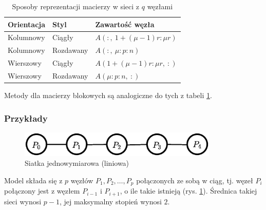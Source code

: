 \begin{table}[H]
\centering
\caption{Sposoby reprezentacji macierzy w sieci z \(q\) węzłami}
\begin{tabular}{ l | l | l }\label{tab:network_datatype}
  Orientacja & Styl & Zawartość węzła \\
  \hline
  Kolumnowy & Ciągły & \(A(\colon,\: 1+(\mu-1)r\colon \mu r)\) \\
  Kolumnowy & Rozdawany & \(A(\colon,\: \mu\colon p\colon n)\) \\
  Wierszowy & Ciągły & \(A(1+(\mu -1) r\colon\mu r,\: \colon)\) \\
  Wierszowy & Rozdawany & \(A(\mu \colon p\colon n,\: \colon)\) \\
 \end{tabular} 
 \end{table}

Metody dla macierzy blokowych są analogiczne do tych z tabeli \ref{tab:network_datatype}.





\subsubsection{Przykłady}
\begin{przyklad}
\begin{figure}[h]
\centering
\includegraphics[width=9.5cm]{images/mesh1d}
\caption{Siatka jednowymiarowa (liniowa)}
\label{fig:model_mesh1d}
\end{figure}
Model składa się z \(p\) węzłów \(P_1, P_2, \dots, P_p\) połączonych ze sobą w ciąg, tj. węzeł \(P_i\) połączony jest z węzłem \(P_{i-1}\) i \(P_{i+1}\), o ile takie istnieją (rys. \ref{fig:model_mesh1d}). Średnica takiej sieci wynosi \(p-1\), jej maksymalny stopień wynosi \(2\).\\
\end{przyklad}

